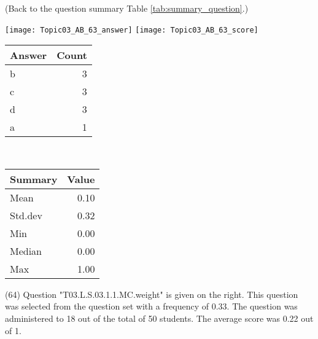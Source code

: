 \documentclass[12pt,english,nohyper]{tufte-handout}\usepackage[]{graphicx}\usepackage[]{color}
\begin{document}
 (Back to the question summary Table \ref{tab:summary_question}.)

\begin{center} \texttt{[image: Topic03\_AB\_63\_answer]} \texttt{[image: Topic03\_AB\_63\_score]} \end{center} 

\begin{center}%
\begin{tabular}{lr}
  \hline
Answer & Count \\ 
  \hline
b &   3 \\ 
  c &   3 \\ 
  d &   3 \\ 
  a &   1 \\ 
   \hline
\end{tabular}
~~~~~~~~%
\begin{tabular}{lr}
  \hline
Summary & Value \\ 
  \hline
Mean & 0.10 \\ 
  Std.dev & 0.32 \\ 
  Min & 0.00 \\ 
  Median & 0.00 \\ 
  Max & 1.00 \\ 
   \hline
\end{tabular}
\end{center}\newpage{} (64) Question "T03.L.S.03.1.1.MC.weight" is given on the right. This question was selected from the question set with a frequency of 0.33. The question was administered to 18 out of the total of 50 students. The average score was 0.22 out of 1.
\end{document}
